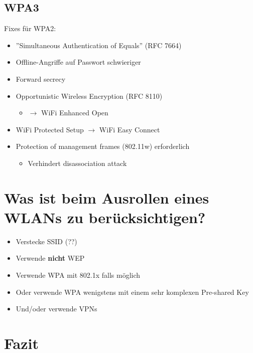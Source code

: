 \documentclass[openany]{book}
\begin{document}
\subsection{WPA3}

Fixes für WPA2:

\begin{itemize}
    \item ''Simultaneous Authentication of Equals'' (RFC 7664)
    \item Offline-Angriffe auf Passwort schwieriger
    \item Forward secrecy
    \item Opportunistic Wireless Encryption (RFC 8110)
    \begin{itemize}
        \item $\rightarrow$ WiFi Enhanced Open
    \end{itemize}
    \item WiFi Protected Setup $\rightarrow$ WiFi Easy Connect
    \item Protection of management frames (802.11w) erforderlich
    \begin{itemize}
        \item Verhindert disassociation attack
    \end{itemize}
\end{itemize}

\section{Was ist beim Ausrollen eines WLANs zu berücksichtigen?}

\begin{itemize}
    \item Verstecke SSID (??)
    \item Verwende \textbf{nicht} WEP
    \item Verwende WPA mit 802.1x falls möglich
    \item Oder verwende WPA wenigstens mit einem sehr komplexen Pre-shared Key
    \item Und/oder verwende VPNs
\end{itemize}

\section{Fazit}
\end{document}
